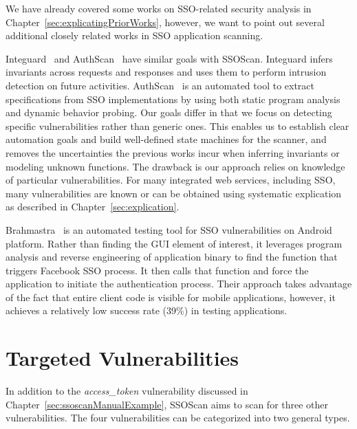  We have already covered some works on SSO-related security analysis in Chapter~\ref{sec:explicatingPriorWorks}, however, we want to point out several additional closely related works in SSO application scanning.

Integuard~\cite{Integuard} and AuthScan~\cite{AuthScan} have similar goals with SSOScan.  Integuard infers invariants across requests and responses and uses them to perform intrusion detection on future activities.  AuthScan~\cite{AuthScan} is an automated tool to extract specifications from SSO implementations by using both static program analysis and dynamic behavior probing.  Our goals differ in that we focus on detecting specific vulnerabilities rather than generic ones.  This enables us to establish clear automation goals and build well-defined state machines for the scanner, and removes the uncertainties the previous works incur when inferring invariants or modeling unknown functions.  The drawback is our approach relies on knowledge of particular vulnerabilities.  For many integrated web services, including SSO, many vulnerabilities are known or can be obtained using systematic explication as described in Chapter~\ref{sec:explication}.

\renewcommand{\thefootnote}{$\star$} 


Brahmastra\footnotemark[1]~\cite{184453} is an automated testing tool for SSO vulnerabilities on Android platform.  Rather than finding the GUI element of interest, it leverages program analysis and reverse engineering of application binary to find the function that triggers Facebook SSO process.  It then calls that function and force the application to initiate the authentication process.  Their approach takes advantage of the fact that entire client code is visible for mobile applications, however, it achieves a relatively low success rate (39\%) in testing applications.

\renewcommand{\thefootnote}{\arabic{footnote}}

\section{Targeted Vulnerabilities}
\label{sec:ssoscanVuls}

In addition to the \emph{access\_token} vulnerability discussed in Chapter~\ref{sec:ssoscanManualExample}, SSOScan aims to scan for three other vulnerabilities.  The four vulnerabilities can be categorized into two general types.

